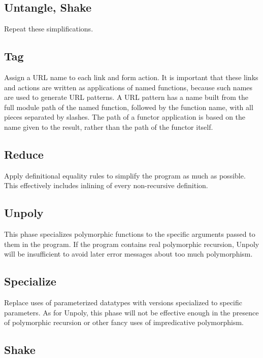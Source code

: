 \documentclass{article}
\begin{document}
\subsection{Untangle, Shake}

Repeat these simplifications.

\subsection{\label{tag}Tag}

Assign a URL name to each link and form action.  It is important that these links and actions are written as applications of named functions, because such names are used to generate URL patterns.  A URL pattern has a name built from the full module path of the named function, followed by the function name, with all pieces separated by slashes.  The path of a functor application is based on the name given to the result, rather than the path of the functor itself.

\subsection{Reduce}

Apply definitional equality rules to simplify the program as much as possible.  This effectively includes inlining of every non-recursive definition.

\subsection{Unpoly}

This phase specializes polymorphic functions to the specific arguments passed to them in the program.  If the program contains real polymorphic recursion, Unpoly will be insufficient to avoid later error messages about too much polymorphism.

\subsection{Specialize}

Replace uses of parameterized datatypes with versions specialized to specific parameters.  As for Unpoly, this phase will not be effective enough in the presence of polymorphic recursion or other fancy uses of impredicative polymorphism.

\subsection{Shake}
\end{document}
